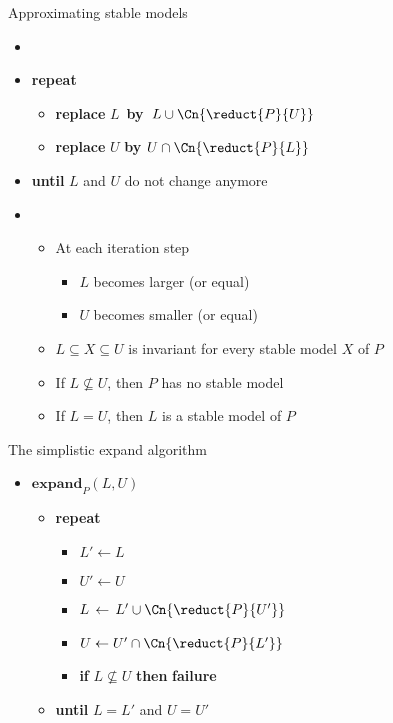 \begin{frame}{Approximating stable models}
  \begin{itemize}
  \item {} \
    \smallskip
  \item []\textbf{repeat}
    \begin{itemize}\normalsize
    \item[] \textbf{replace} $L$\, \textbf{by}\, $L\cup\Cn{\reduct{P}{U}}$
    \item[] \textbf{replace} $U$   \textbf{by}   $U\cap\Cn{\reduct{P}{L}}$
    \end{itemize}
  \item [] \textbf{until} $L$ and $U$ do not change anymore
    \smallskip
  \item<2->  \
    \begin{itemize}\normalsize
    \item At each iteration step
      \begin{itemize}\normalsize
      \item $L$ becomes larger  (or equal)
      \item $U$ becomes smaller (or equal)
      \end{itemize}
    \item $L\subseteq X\subseteq U$ is invariant for every stable model $X$ of $P$
      \medskip
    \item<3-> If $L\not\subseteq U$, then $P$ has no stable model
      \smallskip
    \item<4-> If $L=U$, then $L$ is a stable model of $P$
    \end{itemize}
  \end{itemize}
\end{frame}
\begin{frame}{The simplistic expand algorithm}
  \bigskip
  \begin{itemize}
  \item[] $\mathbf{expand}_{P}(L,U)$ \
    \begin{itemize}\normalsize
    \item[] \textbf{repeat} \
      \begin{itemize}\normalsize
      \item [] $L'\leftarrow L$
      \item [] $U'\leftarrow U$
        \smallskip
      \item [] $L\,\leftarrow\,L'\cup\Cn{\reduct{P}{U'}}$
      \item [] $U  \leftarrow  U'\cap\Cn{\reduct{P}{L'}}$
        \smallskip
      \item [] \textbf{if} $L\not\subseteq U$ \textbf{then} \textbf{failure}
        \smallskip
      \end{itemize}
    \item[]\textbf{until} $L=L'$ and $U=U'$
    \end{itemize}
  \end{itemize}
\end{frame}
